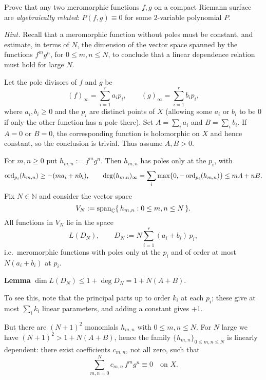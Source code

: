 \documentclass[12pt]{article}  %
\newenvironment{lemma}{\begin{mdframed}[backgroundcolor=gray!20] \textbf{Lemma}}{\end{mdframed}}
\begin{document}
\begin{problem}[4 (from RS2)]
Prove that any two meromorphic functions $f,g$ on a compact Riemann surface are \emph{algebraically related}: $P(f,g)\equiv 0$ for some $2$-variable polynomial $P$.

\emph{Hint.} Recall that a meromorphic function without poles must be constant, and estimate, in terms of $N$, the dimension of the vector space spanned by the functions $f^m g^n$, for $0\le m,n\le N$, to conclude that a linear dependence relation must hold for large $N$.
\end{problem}

\begin{solution}
  Let the pole divisors of $f$ and $g$ be
\[
(f)_\infty=\sum_{i=1}^r a_i p_i,\qquad (g)_\infty=\sum_{i=1}^r b_i p_i,
\]
where $a_i,b_i\ge 0$ and the $p_i$ are distinct points of $X$ (allowing some $a_i$ or
$b_i$ to be $0$ if only the other function has a pole there).
Set $A=\sum_i a_i$ and $B=\sum_i b_i$.
If $A=0$ or $B=0$, the corresponding function is holomorphic on $X$ and hence
constant, so the conclusion is trivial. Thus assume $A,B>0$.

For $m,n\ge 0$ put $h_{m,n}:=f^m g^n$.
Then $h_{m,n}$ has poles only at the $p_i$, with
\[
\operatorname{ord}_{p_i}(h_{m,n})\ge -(ma_i+nb_i),\qquad
\deg (h_{m,n})_\infty=\sum_i\max\{0,-\operatorname{ord}_{p_i}(h_{m,n})\}\le mA+nB.
\]
Fix $N\in\mathbb N$ and consider the vector space
\[
V_N:=\operatorname{span}_{\mathbb{C}}\{\,h_{m,n}: 0\le m,n\le N\,\}.
\]
All functions in $V_N$ lie in the space
\[
L(D_N),\qquad D_N:=N\sum_{i=1}^r (a_i+b_i)\,p_i,
\]
i.e.\ meromorphic functions with poles only at the $p_i$ and of order at most
$N(a_i+b_i)$ at $p_i$.

\begin{lemma}
  $\dim L(D_N) \leq 1 + \deg D_N = 1 + N(A+B)$.
\end{lemma}
To see this, note that the principal parts up to order $k_i$ at each $p_i$; these give at most $\sum_i k_i$ linear parameters, and adding a constant gives +1.

But there are $(N+1)^2$ monomials $h_{m,n}$ with $0\le m,n\le N$.
For $N$ large we have $(N+1)^2>1+N(A+B)$, hence the family
$\{h_{m,n}\}_{0\le m,n\le N}$ is linearly dependent:
there exist coefficients $c_{m,n}$, not all zero, such that
\[
\sum_{m,n=0}^{N} c_{m,n}\, f^m g^n \equiv 0 \quad\text{on } X.
\]
\end{solution}
\end{document}
